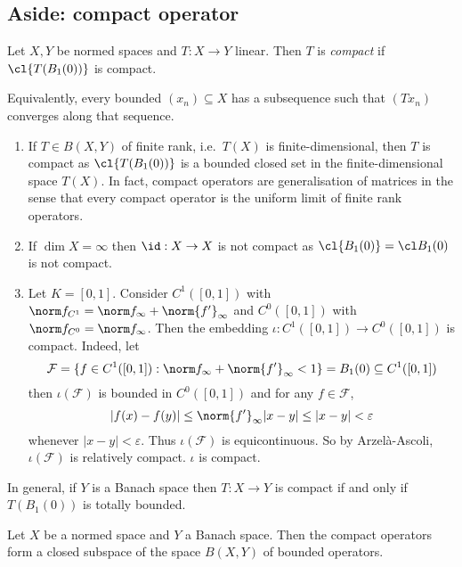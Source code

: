 \documentclass[a4paper]{article}
\begin{document}
\subsection{Aside: compact operator}

\begin{definition}
  Let \(X, Y\) be normed spaces and \(T: X \to Y\) linear. Then \(T\) is \emph{compact} if \(\cl{T(B_1(0))}\) is compact.
\end{definition}

Equivalently, every bounded \((x_n) \subseteq X\) has a subsequence such that \((Tx_n)\) converges along that sequence.

\begin{eg}\leavevmode
  \begin{enumerate}
  \item If \(T \in B(X, Y)\) of finite rank, i.e.\ \(T(X)\) is finite-dimensional, then \(T\) is compact as \(\cl{T(B_1(0))}\) is a bounded closed set in the finite-dimensional space \(T(X)\). In fact, compact operators are generalisation of matrices in the sense that every compact operator is the uniform limit of finite rank operators.
  \item If \(\dim X = \infty\) then \(\id: X \to X\) is not compact as \(\cl{B_1(0)} = \cl B_1(0)\) is not compact.
  \item Let \(K = [0, 1]\). Consider \(C^1([0, 1])\) with \(\norm f_{C^1} = \norm f_\infty + \norm{f'}_\infty\) and \(C^0([0, 1])\) with \(\norm f_{C^0} = \norm f_\infty\). Then the embedding \(\iota: C^1([0, 1]) \to C^0([0, 1])\) is compact. Indeed, let
    \[
      \mathcal F = \{f \in C^1([0, 1]): \norm f_\infty + \norm{f'}_\infty < 1 \} = B_1(0) \subseteq C^1([0, 1])
    \]
    then \(\iota(\mathcal F)\) is bounded in \(C^0([0, 1])\) and for any \(f \in \mathcal F\),
    \[
      |f(x) - f(y)|
      \leq \norm{f'}_\infty |x - y|
      \leq |x - y|
      < \varepsilon
    \]
    whenever \(|x - y| < \varepsilon\). Thus \(\iota(\mathcal F)\) is equicontinuous. So by Arzelà-Ascoli, \(\iota(\mathcal F)\) is relatively compact. \(\iota\) is compact.
  \end{enumerate}
\end{eg}

In general, if \(Y\) is a Banach space then \(T: X \to Y\) is compact if and only if \(T(B_1(0))\) is totally bounded.

\begin{theorem}
  Let \(X\) be a normed space and \(Y\) a Banach space. Then the compact operators form a closed subspace of the space \(B(X, Y)\) of bounded operators.
\end{theorem}
\end{document}
